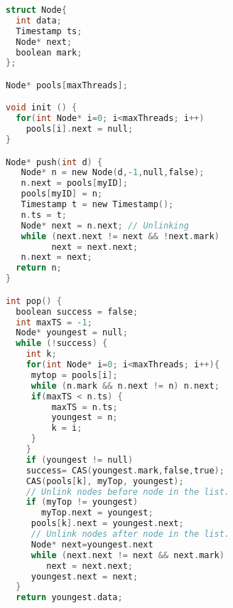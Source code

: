 

\begin{lstlisting}[language=C]
struct Node{
  int data;
  Timestamp ts;
  Node* next; 
  boolean mark;
};

Node* pools[maxThreads]; 

void init () {
  for(int Node* i=0; i<maxThreads; i++)
    pools[i].next = null;
}

Node* push(int d) {
   Node* n = new Node(d,-1,null,false); 
   n.next = pools[myID];
   pools[myID] = n; 
   Timestamp t = new Timestamp();
   n.ts = t;
   Node* next = n.next; // Unlinking
   while (next.next != next && !next.mark)
         next = next.next;
   n.next = next;
  return n;
}

int pop() {
  boolean success = false; 
  int maxTS = -1;
  Node* youngest = null; 
  while (!success) {
    int k;
    for(int Node* i=0; i<maxThreads; i++){
     mytop = pools[i];
     while (n.mark && n.next != n) n.next;
     if(maxTS < n.ts) {
         maxTS = n.ts; 
         youngest = n;
         k = i;
     } 
    }
    if (youngest != null) 
    success= CAS(youngest.mark,false,true);
    CAS(pools[k], myTop, youngest);
    // Unlink nodes before node in the list.
    if (myTop != youngest) 
       myTop.next = youngest;
     pools[k].next = youngest.next;
     // Unlink nodes after node in the list.
     Node* next=youngest.next
     while (next.next != next && next.mark)
        next = next.next;
     youngest.next = next;
  }
  return youngest.data;
\end{lstlisting}